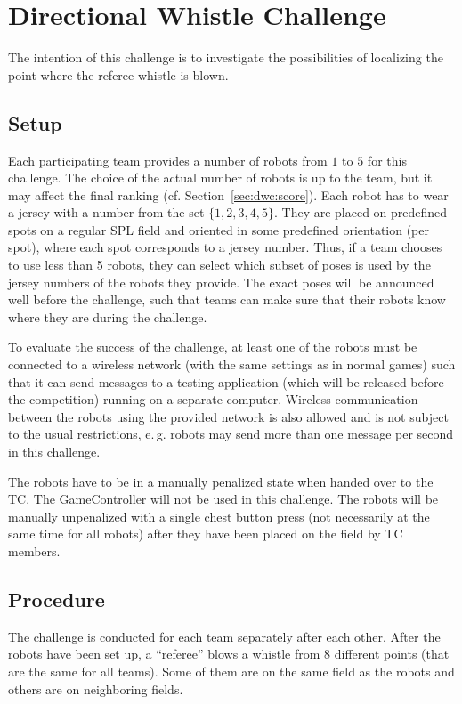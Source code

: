 \documentclass[12pt]{article}
\newcommand{\eg}{\mbox{e.\,g.}\xspace}
\newcommand{\cf}{\mbox{cf.}\xspace}
\begin{document}
\newpage

\section{Directional Whistle Challenge}

The intention of this challenge is to investigate the possibilities of localizing the point where the referee whistle is blown.

\subsection{Setup}
\label{sec:dwc:setup}
Each participating team provides a number of robots from \(1\) to \(5\) for this challenge. The choice of the actual number of robots is up to the team, but it may affect the final ranking (\cf Section~\ref{sec:dwc:score}). Each robot has to wear a jersey with a number from the set \(\{1,2,3,4,5\}\). They are placed on predefined spots on a regular SPL field and oriented in some predefined orientation (per spot), where each spot corresponds to a jersey number. Thus, if a team chooses to use less than 5 robots, they can select which subset of poses is used by the jersey numbers of the robots they provide. The exact poses will be announced well before the challenge, such that teams can make sure that their robots know where they are during the challenge.

To evaluate the success of the challenge, at least one of the robots must be connected to a wireless network (with the same settings as in normal games) such that it can send messages to a testing application (which will be released before the competition) running on a separate computer. Wireless communication between the robots using the provided network is also allowed and is not subject to the usual restrictions, \eg robots may send more than one message per second in this challenge.

The robots have to be in a manually penalized state when handed over to the TC. The GameController will not be used in this challenge. The robots will be manually unpenalized with a single chest button press (not necessarily at the same time for all robots) after they have been placed on the field by TC members.

\subsection{Procedure}
\label{sec:dwc:procedure}
The challenge is conducted for each team separately after each other. After the robots have been set up, a ``referee'' blows a whistle from \(8\) different points (that are the same for all teams). Some of them are on the same field as the robots and others are on neighboring fields.
\end{document}
